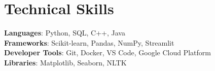\documentclass[letterpaper,11pt]{article}
\begin{document}
\section{Technical Skills}
 \begin{itemize}[leftmargin=0.15in, label={}]
    \small{\item{
     \textbf{Languages}{: Python, SQL, C++, Java} \\
     \textbf{Frameworks}{: Scikit-learn, Pandas, NumPy, Streamlit} \\
     \textbf{Developer Tools}{: Git, Docker, VS Code, Google Cloud Platform} \\
     \textbf{Libraries}{: Matplotlib, Seaborn, NLTK}
    }}
 \end{itemize}


\end{document}
